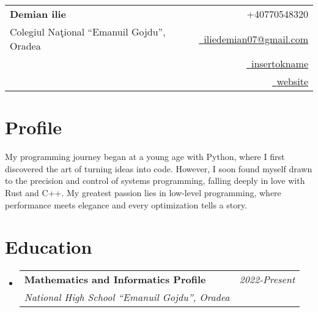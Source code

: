 \documentclass[a4paper,11pt]{article}
\makeatletter
\newcommand{\resumeSubheading}[4]{
\vspace{0.5mm}\item
    \begin{tabular*}{0.98\textwidth}[t]{l@{\extracolsep{\fill}}r}
        \textbf{#1} & \textit{\footnotesize{#4}} \\
        \textit{\footnotesize{#3}} &  \footnotesize{#2}\\
    \end{tabular*}
    \vspace{-2.4mm}
}
\newcommand{\resumeSubHeadingListStart}{\begin{itemize}[leftmargin=*,labelsep=0mm]}
\newcommand{\resumeSubHeadingListEnd}{\end{itemize}\vspace{2mm}}
\newcommand{\name}{Demian ilie} %
\newcommand{\phone}{+40770548320} %
\newcommand{\emaila}{iliedemian07@gmail.com} %
\makeatother
\begin{document}
\selectfont

%     
\parbox{\linewidth}{ %
    \begin{tabularx}{\linewidth}{L r}                                                                                                                                              \\
        \textbf{\Large \name}                         & {\raisebox{0.0\height}{\footnotesize \faPhone}\ \phone}                                                        \\
        {Colegiul Naţional ``Emanuil Gojdu'', Oradea} & \href{mailto:\emaila}{\raisebox{0.0\height}{\footnotesize \faEnvelope}\ {\emaila}}                             \\
                                                      & \href{https://github.com/insertokname}{\raisebox{0.0\height}{\footnotesize \faGithub}\ {insertokname}}         \\
                                                      & \href{https://insertokname.github.io/personal-page/}{\raisebox{0.0\height}{\footnotesize \faGlobe}\ {website}}
    \end{tabularx}
}

\vspace{-0.5cm}
\section{\textbf{Profile}}
\begin{justify}
    My programming journey began at a young age with Python, where I first discovered the art of turning ideas into code.
    However, I soon found myself drawn to the precision and control of systems programming, falling deeply in love with Rust and C++.
    My greatest passion lies in low-level programming, where performance meets elegance and every optimization tells a story.
\end{justify}


\section{\textbf{Education}}
\resumeSubHeadingListStart
\resumeSubheading
{Mathematics and Informatics Profile}{}
{National High School ``Emanuil Gojdu'', Oradea}{2022-Present}
\resumeSubHeadingListEnd
\vspace{-5.5mm}
\end{document}
